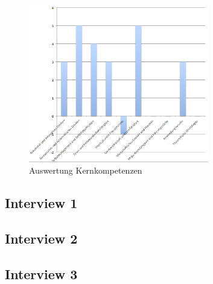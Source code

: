 \begin{figure}[ht]
	\centering
	\includegraphics[width=0.7\textwidth]{images/Auswertung_kernkompetenzen.png}
	\caption{Auswertung Kernkompetenzen}
	\label{fig:auswerkomp}
\end{figure}



\subsection{Interview 1}

\subsection{Interview 2}

\subsection{Interview 3}
